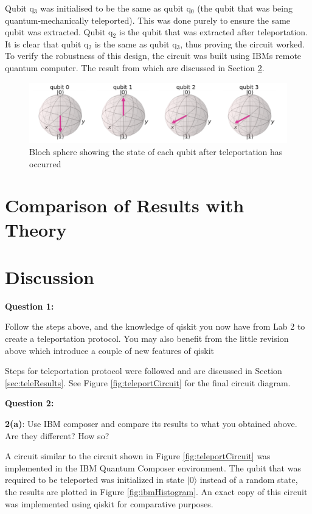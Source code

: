 Qubit q$_3$ was initialised to be the same as qubit q$_0$ (the qubit that was being quantum-mechanically teleported). This was done purely to ensure the same qubit was extracted. Qubit q$_2$ is the qubit that was extracted after teleportation. It is clear that qubit q$_2$ is the same as qubit q$_3$, thus proving the circuit worked. To verify the robustness of this design, the circuit was built using IBMs remote quantum computer. The result from which are discussed in Section \ref{sec:discussTeleport}.

\begin{figure}[h]
    \centering
    \includegraphics[width=\textwidth]{lab3/images/teleportBloch.png}
    \caption{Bloch sphere showing the state of each qubit after teleportation has occurred}
    \label{fig:teleportBloch}
\end{figure}

\section{Comparison of Results with Theory}
\section{Discussion} \label{sec:discussTeleport}
\textbf{Question 1:}

Follow the steps above, and the knowledge of qiskit you now have from Lab 2 to create a teleportation protocol. You may also benefit from the little revision above which introduce a couple of new features of qiskit

Steps for teleportation protocol were followed and are discussed in Section \ref{sec:teleResults}. See Figure \ref{fig:teleportCircuit} for the final circuit diagram.

\textbf{Question 2:}

\textbf{2(a)}: Use IBM composer and compare its results to what you obtained above. Are they different? How so?

A circuit similar to the circuit shown in Figure \ref{fig:teleportCircuit} was implemented in the IBM Quantum Composer environment. The qubit that was required to be teleported was initialized in state $|0\rangle$ instead of a random state, the results are plotted in Figure \ref{fig:ibmHistogram}. An exact copy of this circuit was implemented using qiskit for comparative purposes.

